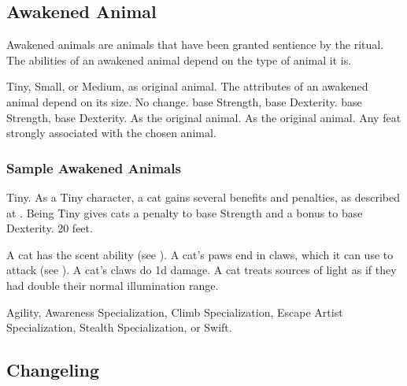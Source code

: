     \subsection{Awakened Animal}

        Awakened animals are animals that have been granted sentience by the  ritual.
        The abilities of an awakened animal depend on the type of animal it is.

         Tiny, Small, or Medium, as original animal.
         The attributes of an awakened animal depend on its size.
         No change.
          base Strength,  base Dexterity.
          base Strength,  base Dexterity.
         As the original animal.
         As the original animal.
         Any feat strongly associated with the chosen animal.

        \subsubsection{Sample Awakened Animals}


             Tiny. As a Tiny character, a cat gains several benefits and penalties, as described at .
             Being Tiny gives cats a  penalty to base Strength and a  bonus to base Dexterity.
             20 feet.
            \begin{itemize}
                 A cat has the scent ability (see ).
                 A cat's paws end in claws, which it can use to attack (see ). A cat's claws do \minus1d damage.
                 A cat treats sources of light as if they had double their normal illumination range.
            \end{itemize}
         Agility, Awareness Specialization, Climb Specialization, Escape Artist Specialization, Stealth Specialization, or Swift.

    \subsection{Changeling}

